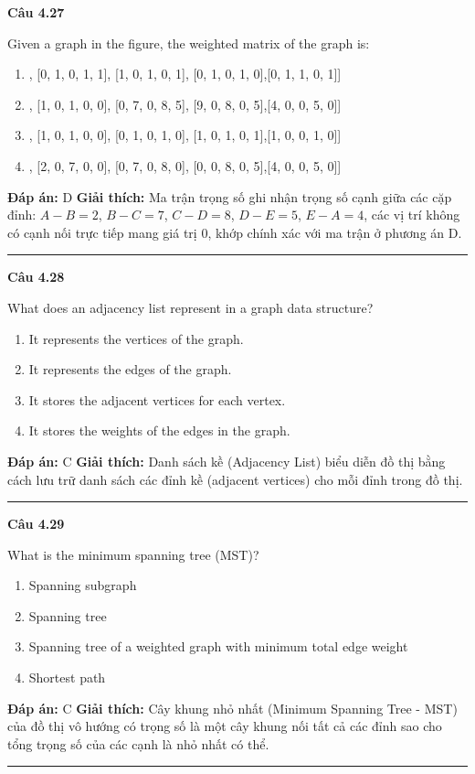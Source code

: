\documentclass[11pt,a4paper]{article}
\newenvironment{question}[1]{%
  \par\vspace{1em}\noindent\textbf{\large Câu #1}\par\vspace{0.4em}
}{%
  \par\vspace{1em}\hrule\vspace{0.6em}
}
\newenvironment{choices}{%
  \begin{enumerate}[label=\textbf{\Alph*.},leftmargin=2.2em,itemsep=2pt,topsep=3pt]
}{%
  \end{enumerate}
}
\newcommand{\choice}{\item}
\begin{document}
\begin{question}{4.27}
Given a graph in the figure, the weighted matrix of the graph is:
\begin{center}
\end{center}
\begin{choices}
\choice [[1, 0, 1, 0, 0], [0, 1, 0, 1, 1], [1, 0, 1, 0, 1], [0, 1, 0, 1, 0],[0, 1, 1, 0, 1]]
\choice [[0, 2, 0, 1, 4], [1, 0, 1, 0, 0], [0, 7, 0, 8, 5], [9, 0, 8, 0, 5],[4, 0, 0, 5, 0]]
\choice [[0, 1, 0, 1, 1], [1, 0, 1, 0, 0], [0, 1, 0, 1, 0], [1, 0, 1, 0, 1],[1, 0, 0, 1, 0]]
\choice [[0, 2, 0, 0, 4], [2, 0, 7, 0, 0], [0, 7, 0, 8, 0], [0, 0, 8, 0, 5],[4, 0, 0, 5, 0]]
\end{choices}
\textbf{Đáp án:} D
\textbf{Giải thích:} Ma trận trọng số ghi nhận trọng số cạnh giữa các cặp đỉnh: $A-B=2$, $B-C=7$, $C-D=8$, $D-E=5$, $E-A=4$, các vị trí không có cạnh nối trực tiếp mang giá trị 0, khớp chính xác với ma trận ở phương án D.
\end{question}

\begin{question}{4.28}
What does an adjacency list represent in a graph data structure?
\begin{choices}
\choice It represents the vertices of the graph.
\choice It represents the edges of the graph.
\choice It stores the adjacent vertices for each vertex.
\choice It stores the weights of the edges in the graph.
\end{choices}
\textbf{Đáp án:} C
\textbf{Giải thích:} Danh sách kề (Adjacency List) biểu diễn đồ thị bằng cách lưu trữ danh sách các đỉnh kề (adjacent vertices) cho mỗi đỉnh trong đồ thị.
\end{question}

\begin{question}{4.29}
What is the minimum spanning tree (MST)?
\begin{choices}
\choice Spanning subgraph
\choice Spanning tree
\choice Spanning tree of a weighted graph with minimum total edge weight
\choice Shortest path
\end{choices}
\textbf{Đáp án:} C
\textbf{Giải thích:} Cây khung nhỏ nhất (Minimum Spanning Tree - MST) của đồ thị vô hướng có trọng số là một cây khung nối tất cả các đỉnh sao cho tổng trọng số của các cạnh là nhỏ nhất có thể.
\end{question}
\end{document}
